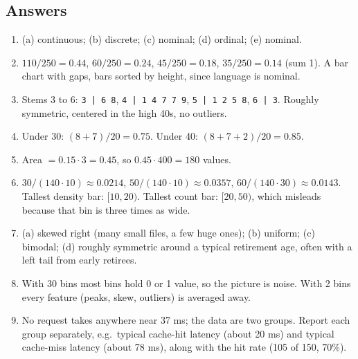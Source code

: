 \subsection*{Answers}

\begin{enumerate}
  \item (a) continuous; (b) discrete; (c) nominal; (d) ordinal; (e) nominal.
  \item $110/250 = 0.44$, $60/250 = 0.24$, $45/250 = 0.18$, $35/250 = 0.14$ (sum 1). A bar chart
  with gaps, bars sorted by height, since language is nominal.
  \item Stems 3 to 6: \texttt{3 | 6 8}, \texttt{4 | 1 4 7 7 9}, \texttt{5 | 1 2 5 8},
  \texttt{6 | 3}. Roughly symmetric, centered in the high 40s, no outliers.
  \item Under 30: $(8+7)/20 = 0.75$. Under 40: $(8+7+2)/20 = 0.85$.
  \item Area $= 0.15 \cdot 3 = 0.45$, so $0.45 \cdot 400 = 180$ values.
  \item $30/(140\cdot 10) \approx 0.0214$, $50/(140\cdot 10) \approx 0.0357$,
  $60/(140\cdot 30) \approx 0.0143$. Tallest density bar: $[10,20)$. Tallest count bar:
  $[20,50)$, which misleads because that bin is three times as wide.
  \item (a) skewed right (many small files, a few huge ones); (b) uniform; (c) bimodal;
  (d) roughly symmetric around a typical retirement age, often with a left tail from early
  retirees.
  \item With 30 bins most bins hold 0 or 1 value, so the picture is noise. With 2 bins every
  feature (peaks, skew, outliers) is averaged away.
  \item No request takes anywhere near 37 ms; the data are two groups. Report each group
  separately, e.g.\ typical cache-hit latency (about 20 ms) and typical cache-miss latency
  (about 78 ms), along with the hit rate (105 of 150, 70\%).
\end{enumerate}
